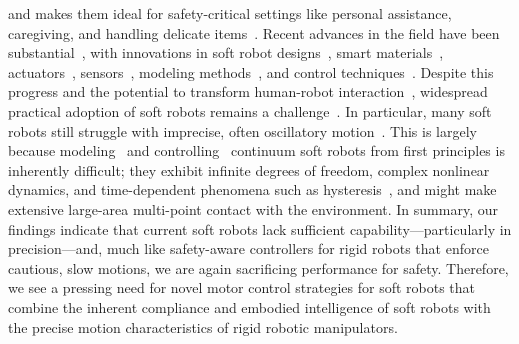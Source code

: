 and makes them ideal for safety-critical settings like personal assistance, caregiving, and handling delicate items~\citep{abidi2017intrinsic, yumbla2021human}.
Recent advances in the field have been substantial~\citep{yasa2023overview}, with innovations in soft robot designs~\citep{laschi2012soft, hawkes2017soft, guan2023trimmed, katzschmann2018exploration, tolley2014resilient}, smart materials~\citep{terryn2017self, mazzolai2022roadmap}, actuators~\citep{shepherd2013using, vasios2020harnessing, lipton2018handedness, gravert2024low, wehner2016integrated, aubin2022towards}, sensors~\citep{larson2016highly, thuruthel2019soft, truby2020distributed}, modeling methods~\citep{renda2018discrete, boyer2020dynamics, renda2020geometric}, and control techniques~\citep{thuruthel2018model, della2020model, jitosho2023reinforcement, pustina2024input}. Despite this progress and the potential to transform human-robot interaction~\citep{jorgensen2022soft}, widespread practical adoption of soft robots remains a challenge~\citep{hawkes2021hard}. In particular, many soft robots still struggle with imprecise, often oscillatory motion~\citep{mazzolai2022roadmap, majidi2014soft, hawkes2017soft}. This is largely because modeling~\citep{armanini2023soft} and controlling~\citep{della2023model} continuum soft robots from first principles is inherently difficult; they exhibit infinite degrees of freedom, complex nonlinear dynamics, and time-dependent phenomena such as hysteresis~\citep{armanini2023soft}, and might make extensive large-area multi-point contact with the environment.
In summary, our findings indicate that current soft robots lack sufficient capability—particularly in precision—and, much like safety-aware controllers for rigid robots that enforce cautious, slow motions, we are again sacrificing performance for safety.
Therefore, we see a pressing need for novel motor control strategies for soft robots that combine the inherent compliance and embodied intelligence of soft robots with the precise motion characteristics of rigid robotic manipulators.

